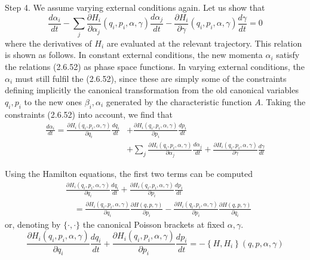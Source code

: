 \documentclass{article}
\begin{document}
Step 4. We assume varying external conditions again. Let us show that
$$
\begin{equation*}
\frac{d \alpha_{i}}{d t}-\sum_{j} \frac{\partial H_{i}}{\partial \alpha_{j}}\left(q_{i}, p_{i}, \alpha, \gamma\right) \frac{d \alpha_{j}}{d t}-\frac{\partial H_{i}}{\partial \gamma}\left(q_{i}, p_{i}, \alpha, \gamma\right) \frac{d \gamma}{d t}=0 \tag{2.6.61}
\end{equation*}
$$
where the derivatives of $H_{i}$ are evaluated at the relevant trajectory. This relation is shown as follows. In constant external conditions, the new momenta $\alpha_{i}$ satisfy the relations (2.6.52) as phase space functions. In varying external conditions, the $\alpha_{i}$ must still fulfil the (2.6.52), since these are simply some of the constraints defining implicitly the canonical transformation from the old canonical variables $q_{i}, p_{i}$ to the new ones $\beta_{i}, \alpha_{i}$ generated by the characteristic function $A$. Taking the constraints (2.6.52) into account, we find that
$$
\begin{align*}
\frac{d \alpha_{i}}{d t}=\frac{\partial H_{i}\left(q_{i}, p_{i}, \alpha, \gamma\right)}{\partial q_{i}} \frac{d q_{i}}{d t} & +\frac{\partial H_{i}\left(q_{i}, p_{i}, \alpha, \gamma\right)}{\partial p_{i}} \frac{d p_{i}}{d t}  \tag{2.6.62}\\
& +\sum_{j} \frac{\partial H_{i}\left(q_{i}, p_{i}, \alpha, \gamma\right)}{\partial \alpha_{j}} \frac{d \alpha_{j}}{d t}+\frac{\partial H_{i}\left(q_{i}, p_{i}, \alpha, \gamma\right)}{\partial \gamma} \frac{d \gamma}{d t}
\end{align*}
$$

Using the Hamilton equations, the first two terms can be computed
$$
\begin{align*}
& \frac{\partial H_{i}\left(q_{i}, p_{i}, \alpha, \gamma\right)}{\partial q_{i}} \frac{d q_{i}}{d t}+\frac{\partial H_{i}\left(q_{i}, p_{i}, \alpha, \gamma\right)}{\partial p_{i}} \frac{d p_{i}}{d t}  \tag{2.6.63}\\
& \quad=\frac{\partial H_{i}\left(q_{i}, p_{i}, \alpha, \gamma\right)}{\partial q_{i}} \frac{\partial H(q, p, \gamma)}{\partial p_{i}}-\frac{\partial H_{i}\left(q_{i}, p_{i}, \alpha, \gamma\right)}{\partial p_{i}} \frac{\partial H(q, p, \gamma)}{\partial q_{i}}
\end{align*}
$$
or, denoting by $\{\cdot, \cdot\}$ the canonical Poisson brackets at fixed $\alpha, \gamma$.
$$
\begin{equation*}
\frac{\partial H_{i}\left(q_{i}, p_{i}, \alpha, \gamma\right)}{\partial q_{i}} \frac{d q_{i}}{d t}+\frac{\partial H_{i}\left(q_{i}, p_{i}, \alpha, \gamma\right)}{\partial p_{i}} \frac{d p_{i}}{d t}=-\left\{H, H_{i}\right\}(q, p, \alpha, \gamma) \tag{2.6.64}
\end{equation*}
$$
\end{document}
